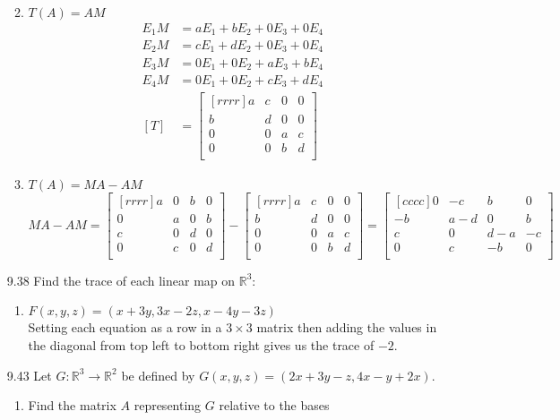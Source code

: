 \documentclass[12pt]{article}
\theoremstyle{definition}
\theoremstyle{plain}
\begin{document}
\begin{enumerate}
\begin{enumerate}
\begin{align*}
		\end{align*}
	\item $T(A)=AM$
		\begin{align*}
		E_1M&= aE_1+bE_2+0E_3+0E_4\\
		E_2M&= cE_1+dE_2+0E_3+0E_4\\
		E_3M&= 0E_1+0E_2+aE_3+bE_4\\
		E_4M&= 0E_1+0E_2+cE_3+dE_4\\
		[T]&=\begin{bmatrix}[rrrr]a&c&0&0\\b&d&0&0\\0&0&a&c\\0&0&b&d\\\end{bmatrix}
		\end{align*}
	\item $T(A)=MA-AM$
		\[ MA-AM=\begin{bmatrix}[rrrr]a&0&b&0\\0&a&0&b\\c&0&d&0\\0&c&0&d\\\end{bmatrix}-\begin{bmatrix}[rrrr]a&c&0&0\\b&d&0&0\\0&0&a&c\\0&0&b&d\\\end{bmatrix} = \begin{bmatrix}[cccc]0&-c&b&0\\-b&a-d&0&b\\c&0&d-a&-c\\0&c&-b&0\\\end{bmatrix} \]
	\end{enumerate}
\item[9.38]Find the trace of each linear map on $\mathbb{R}^3$:
	\begin{enumerate}
	\item $F(x,y,z)=(x+3y,3x-2z,x-4y-3z)$\\
		Setting each equation as a row in a $3\times 3$ matrix then adding the values in the diagonal from top left to bottom right gives us the trace of $-2$.
	\end{enumerate}
\item[9.43]Let $G:\mathbb{R}^3\rightarrow\mathbb{R}^2$ be defined by $G(x,y,z)=(2x+3y-z,4x-y+2x)$.
	\begin{enumerate}
	\item Find the matrix $A$ representing $G$ relative to the bases

\end{enumerate}
\end{enumerate}
\end{document}
